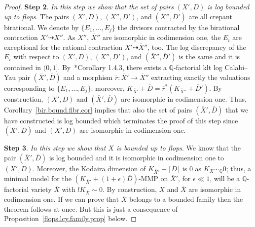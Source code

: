 \documentclass[11pt]{ip-journal}
\theoremstyle{definition}
\begin{document}
\begin{proof}
{\bf Step 2}. 
{\it 
In this step we show that the set of pairs 
$(X', D)$ is log bounded up to flops}.
\newline
The pairs 
$(X', D)$, 
$(X'', D')$, 
and 
$(\overline{X}'', \overline{D}')$ 
are all crepant birational.
We denote by 
$\{E_1, \dots, E_j\}$ 
the divisors contracted by the birational contraction 
$X' \dashrightarrow X''$.
As 
$X''$, 
$\overline{X}''$ 
are isomorphic in codimension one, the 
$E_i$ 
are exceptional for the rational contraction 
$X' \dashrightarrow \overline{X}''$, 
too.
The log discrepancy of the 
$E_i$ 
with respect to 
$(X', D)$, 
$(X'', D')$, 
and 
$(\overline{X}'', \overline{D}')$ 
is the same and it is contained in 
$(0, 1]$.
By~\cite{BCHM}*{Corollary 1.4.3}, there exists a 
$\mathbb{Q}$-factorial 
klt log Calabi--Yau pair 
$(\overline{X}', \overline{D})$ 
and a morphism 
$\overline{r} \colon \overline{X}' \to \overline{X}''$
extracting exactly the valuations corresponding to 
$\{ E_1, \dots, E_j\}$;
moreover, 
$K_{\overline{X}'}+ \overline{D} 
= \overline{r}^\ast(K_{\overline{X}''}+\overline{D}')$.
By construction, 
$(X', D)$ 
and 
$(\overline{X}', \overline{D})$ 
are isomorphic in codimension one.
Thus, Corollary~\ref{bir.bound.fibr.cor} implies that also the set of pairs 
$(\overline{X}', \overline{D})$ 
that we have constructed is log bounded which terminates the proof of this step since 
$(\overline{X}', \overline{D})$ 
and 
$(X', D)$
are isomorphic in codimension one.

\medskip

{\bf Step 3}. 
{\it In this step we show that $X$ is bounded up to flops}.
\newline
We know that the pair $(\overline{X}', \overline{D})$ is log bounded and it is isomorphic in codimension one to $(X', D)$.
Moreover, the Kodaira dimension of $K_{\overline{X}'}+ \lceil\overline{D}\rceil$ is $0$ as $K_X \sim_\mathbb{Q} 0$; 
thus, a minimal model for the $(K_{\overline{X}'}+(1+\epsilon)\overline{D})$-MMP on $\overline{X}'$, for $\epsilon \ll 1$, will be a $\mathbb{Q}$-factorial variety $\overline{X}$ with $lK_{\overline{X}} \sim 0$.
By construction, $X$ and $\overline{X}$ are isomorphic in codimension one. 
If we can prove that $\overline{X}$ belongs to a bounded family then the theorem follows at once.
But this is just a consequence of Proposition~\ref{flops.lcy.family.prop} below.
\end{proof}
\end{document}
